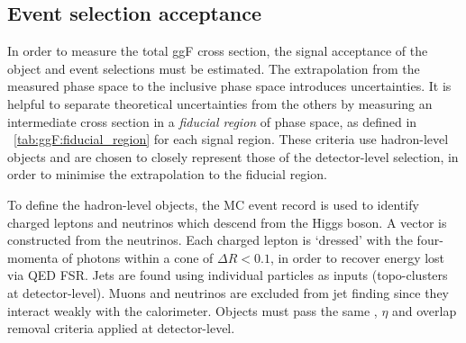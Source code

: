 \subsection{Event selection acceptance}
\label{sec:ggF:acc}

In order to measure the total ggF cross section, the signal acceptance of the object and 
event selections must be estimated. The extrapolation from the measured phase 
space to the inclusive phase space introduces uncertainties. It is helpful to 
separate theoretical uncertainties from the others by measuring an intermediate cross 
section in a \textit{fiducial region} of phase space, as defined in 
\Table~\ref{tab:ggF:fiducial_region} for each signal region. These criteria use 
hadron-level objects and are chosen to closely represent those of the detector-level 
selection, in order to minimise the extrapolation to the fiducial region.

To define the hadron-level objects, the MC event record is used to identify charged leptons 
and neutrinos which descend from the Higgs boson. A \truthmetvec vector is constructed from 
the neutrinos. Each charged lepton is `dressed' with the four-momenta of photons within a cone of 
$\Delta R < 0.1$, in order to recover energy lost via QED FSR. Jets are found using 
individual particles as inputs (\cf topo-clusters at detector-level). Muons and neutrinos 
are excluded from jet finding since they interact weakly with the calorimeter. Objects 
must pass the same \pt, $\eta$ and overlap removal criteria applied at detector-level.

